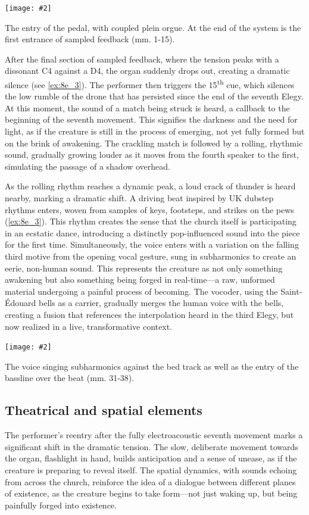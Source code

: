 \documentclass[12pt,twoside,maitrise]{dms_ks}
\newcommand{\customincludeexamples}[4][]{%
    \begin{example}[H]
        \centering
        \texttt{[image: \#2]}
        \caption{#4}
	\label{#3} 
    \end{example}
}
\theoremstyle{definition}
\begin{document}
{{\customincludeexamples[width=\textwidth]{8e_2}{ex:8e_2}{The entry of the pedal, with coupled plein orgue. At the end of the system is the first entrance of sampled feedback (mm. 1-15).}

After the final section of sampled feedback, where the tension peaks with a dissonant C4 against a D4, the organ suddenly drops out, creating a dramatic silence (see \cref{ex:8e_3}). 
The performer then triggers the 15\textsuperscript{th} cue, which silences the low rumble of the drone that has persisted since the end of the seventh Elegy. 
At this moment, the sound of a match being struck is heard, a callback to the beginning of the seventh movement. 
This signifies the darkness and the need for light, as if the creature is still in the process of emerging, not yet fully formed but on the brink of awakening. 
The crackling match is followed by a rolling, rhythmic sound, gradually growing louder as it moves from the fourth speaker to the first, simulating the passage of a shadow overhead.

As the rolling rhythm reaches a dynamic peak, a loud crack of thunder is heard nearby, marking a dramatic shift. 
A driving beat inspired by UK dubstep rhythms enters, woven from samples of keys, footsteps, and strikes on the pews (\cref{ex:8e_3}). 
This rhythm creates the sense that the church itself is participating in an ecstatic dance, introducing a distinctly pop-influenced sound into the piece for the first time. 
Simultaneously, the voice enters with a variation on the falling third motive from the opening vocal gesture, sung in subharmonics to create an eerie, non-human sound. 
This represents the creature as not only something awakening but also something being forged in real-time—a raw, unformed material undergoing a painful process of becoming. 
The vocoder, using the Saint-Édouard bells as a carrier, gradually merges the human voice with the bells, creating a fusion that references the interpolation heard in the third Elegy, but now realized in a live, transformative context.

\customincludeexamples[width=\textwidth]{8e_3}{ex:8e_3}{The voice singing subharmonics against the bed track as well as the entry of the bassline over the beat (mm. 31-38).}

\subsection{Theatrical and spatial elements}

The performer’s reentry after the fully electroacoustic seventh movement marks a significant shift in the dramatic tension. 
The slow, deliberate movement towards the organ, flashlight in hand, builds anticipation and a sense of unease, as if the creature is preparing to reveal itself. 
The spatial dynamics, with sounds echoing from across the church, reinforce the idea of a dialogue between different planes of existence, as the creature begins to take form—not just waking up, but being painfully forged into existence.

}}
\end{document}
